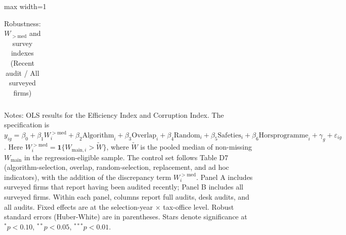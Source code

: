 \documentclass{article}
\newcommand{\OutPath}{Output/}%
\newcommand{\OutPath}{../Output/}%
\begin{document}
\begin{table}[!htbp]
\centering
\begin{adjustbox}{max width=1\textwidth}
\begin{threeparttable}
\caption{Robustness: \(W_{>\mathrm{med}}\) and survey indexes (Recent audit / All surveyed firms)}
\begin{tabular}{l*{6}{c}}

\end{tabular}
\begin{tablenotes}[flushleft]
\footnotesize
\item Notes: OLS results for the Efficiency Index and Corruption Index. The specification is \(y_{ig}=\beta_0+\beta_1 W_i^{>\mathrm{med}}+\beta_2 \text{Algorithm}_i+\beta_3 \text{Overlap}_i+\beta_4 \text{Random}_i+\beta_5 \text{Safeties}_i+\beta_6 \text{Horsprogramme}_i+\gamma_g+\varepsilon_{ig}\). Here \(W_i^{>\mathrm{med}}=\mathbf{1}\{W_{\text{main},i}>\widetilde{W}\}\), where \(\widetilde{W}\) is the pooled median of non-missing \(W_{\text{main}}\) in the regression-eligible sample. The control set follows Table D7 (algorithm-selection, overlap, random-selection, replacement, and ad hoc indicators), with the addition of the discrepancy term \(W_i^{>\mathrm{med}}\). Panel A includes surveyed firms that report having been audited recently; Panel B includes all surveyed firms. Within each panel, columns report full audits, desk audits, and all audits. Fixed effects are at the selection-year \(\times\) tax-office level. Robust standard errors (Huber-White) are in parentheses. Stars denote significance at \(^{*}p<0.10\), \(^{**}p<0.05\), \(^{***}p<0.01\).
\end{tablenotes}
\end{threeparttable}
\end{adjustbox}
\end{table}
\end{document}
